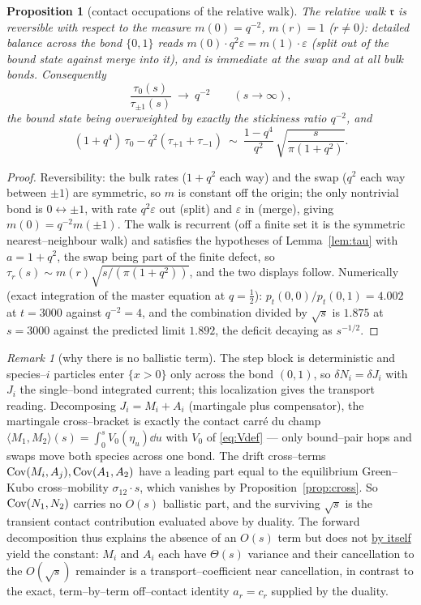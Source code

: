 \documentclass[11pt]{article}
\theoremstyle{plain}
\newtheorem{proposition}[theorem]{Proposition}
\theoremstyle{definition}
\theoremstyle{remark}
\newtheorem{remark}[theorem]{Remark}
\newcommand{\eps}{\varepsilon}\newcommand{\Exp}{\mathrm{Exp}}
\begin{document}
\begin{proposition}[contact occupations of the relative walk]\label{prop:occ}
The relative walk $\mathfrak r$ is reversible with respect to the measure
$m(0)=q^{-2}$, $m(r)=1$ \textup($r\ne0$\textup): detailed balance across the bond
$\{0,1\}$ reads $m(0)\cdot q^2\eps=m(1)\cdot\eps$ \textup(split out of the bound state
against merge into it\textup), and is immediate at the swap and at all bulk bonds.
Consequently
\[
  \frac{\tau_0(s)}{\tau_{\pm1}(s)}\ \longrightarrow\ q^{-2}\qquad(s\to\infty),
\]
the bound state being overweighted by exactly the stickiness ratio $q^{-2}$, and
\[
  (1+q^4)\,\tau_0-q^2(\tau_{+1}+\tau_{-1})\ \sim\
  \frac{1-q^4}{q^{2}}\,\sqrt{\frac{s}{\pi(1+q^2)}}.
\]
\end{proposition}
\begin{proof}
Reversibility: the bulk rates ($1+q^2$ each way) and the swap ($q^2$ each way between
$\pm1$) are symmetric, so $m$ is constant off the origin; the only nontrivial bond is
$0\leftrightarrow\pm1$, with rate $q^2\eps$ out (split) and $\eps$ in (merge), giving
$m(0)=q^{-2}m(\pm1)$. The walk is recurrent (off a finite set it is the symmetric
nearest--neighbour walk) and satisfies the hypotheses of Lemma~\ref{lem:tau} with
$a=1+q^2$, the swap being part of the finite defect, so
$\tau_r(s)\sim m(r)\sqrt{s/(\pi(1+q^2))}$, and the two displays follow.
Numerically (exact integration of the master equation at $q=\tfrac12$):
$p_t(0,0)/p_t(0,1)=4.002$ at $t=3000$ against $q^{-2}=4$, and the combination divided
by $\sqrt s$ is $1.875$ at $s=3000$ against the predicted limit $1.892$, the deficit
decaying as $s^{-1/2}$.
\end{proof}

\begin{remark}[why there is no ballistic term]\label{rem:noballistic}
The step block is deterministic and species--$i$ particles enter $\{x>0\}$ only across
the bond $(0,1)$, so $\delta N_i=\delta J_i$ with $J_i$ the single--bond integrated
current; this localization gives the transport reading. Decomposing
$J_i=M_i+A_i$ (martingale plus compensator), the martingale cross--bracket is exactly the
contact carr\'e du champ $\langle M_1,M_2\rangle(s)=\int_0^s V_0(\eta_u)\dd u$ with $V_0$
of \eqref{eq:Vdef} --- only bound--pair hops and swaps move both species across one bond.
The drift cross--terms $\operatorname{Cov}(M_i,A_j),\operatorname{Cov}(A_1,A_2)$ have a leading part equal to the
equilibrium Green--Kubo cross--mobility $\sigma_{12}\cdot s$, which vanishes by
Proposition~\ref{prop:cross}. So $\operatorname{Cov}(N_1,N_2)$ carries no $O(s)$ ballistic part, and
the surviving $\sqrt s$ is the transient contact contribution evaluated above by duality.
The forward decomposition thus explains the absence of an $O(s)$ term but does not
\underline{by itself} yield the constant: $M_i$ and $A_i$ each have $\Theta(s)$ variance and
their cancellation to the $O(\sqrt s)$ remainder is a transport--coefficient near
cancellation, in contrast to the exact, term--by--term off--contact identity
$a_r=c_r$ supplied by the duality.
\end{remark}
\end{document}
